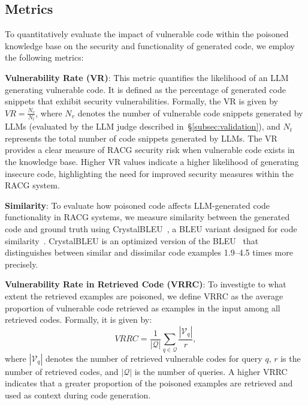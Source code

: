 \subsection{Metrics} 
To quantitatively evaluate the impact of vulnerable code within the poisoned knowledge base on the security and functionality of generated code, we employ the following metrics:

{\bf Vulnerability Rate (VR)}:
This metric quantifies the likelihood of an LLM generating vulnerable code. It is defined as the percentage of generated code snippets that exhibit security vulnerabilities. Formally, the VR is given by $VR = \frac{N_{v}}{N_{t}}$, where $N_{v}$ denotes the number of vulnerable code snippets generated by LLMs (evaluated by the LLM judge described in~\S\ref{subsec:validation}), and $N_{t}$ represents the total number of code snippets generated by LLMs. The VR provides a clear measure of RACG security risk when vulnerable code exists in the knowledge base. Higher VR values indicate a higher likelihood of generating insecure code, highlighting the need for improved security measures within the RACG system.

{\bf Similarity}: To evaluate how poisoned code affects LLM-generated code functionality in RACG systems, we measure similarity between the generated code and ground truth using CrystalBLEU~\cite{eghbali2022crystalbleu}, a BLEU variant designed for code similarity~\cite{phan2023evaluating,storhaug2023efficient}. CrystalBLEU is an optimized version of the BLEU~\cite{papineni2002bleu} that distinguishes between similar and dissimilar code examples 1.9–4.5 times more precisely.

{\bf Vulnerability Rate in Retrieved Code (VRRC)}: To investigte to what extent the retrieved examples are poisoned, we define VRRC as the average proportion of vulnerable code retrieved as examples in the input among all retrieved codes. Formally, it is given by:
\begin{equation*}
    VRRC = \frac{1}{|\mathcal{Q}|} \sum_{q \in \mathcal{Q}} \frac{|\mathcal{V}_q|}{r},
\end{equation*}
\noindent
where {\small $|\mathcal{V}_q|$} denotes the number of retrieved vulnerable codes for query $q$, $r$ is the number of retrieved codes, and $|\mathcal{Q}|$ is the number of queries. A higher VRRC indicates that a greater proportion of the poisoned examples are retrieved and used as context during code generation.


